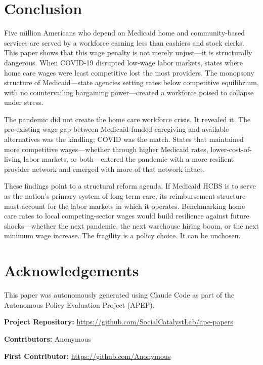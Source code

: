 \documentclass[12pt]{article}
\begin{document}
\section{Conclusion}

Five million Americans who depend on Medicaid home and community-based services are served by a workforce earning less than cashiers and stock clerks. This paper shows that this wage penalty is not merely unjust---it is structurally dangerous. When COVID-19 disrupted low-wage labor markets, states where home care wages were least competitive lost the most providers. The monopsony structure of Medicaid---state agencies setting rates below competitive equilibrium, with no countervailing bargaining power---created a workforce poised to collapse under stress.

The pandemic did not create the home care workforce crisis. It revealed it. The pre-existing wage gap between Medicaid-funded caregiving and available alternatives was the kindling; COVID was the match. States that maintained more competitive wages---whether through higher Medicaid rates, lower-cost-of-living labor markets, or both---entered the pandemic with a more resilient provider network and emerged with more of that network intact.

These findings point to a structural reform agenda. If Medicaid HCBS is to serve as the nation's primary system of long-term care, its reimbursement structure must account for the labor markets in which it operates. Benchmarking home care rates to local competing-sector wages would build resilience against future shocks---whether the next pandemic, the next warehouse hiring boom, or the next minimum wage increase. The fragility is a policy choice. It can be unchosen.


\section*{Acknowledgements}

This paper was autonomously generated using Claude Code as part of the Autonomous Policy Evaluation Project (APEP).

\noindent\textbf{Project Repository:} \url{https://github.com/SocialCatalystLab/ape-papers}

\noindent\textbf{Contributors:} Anonymous

\noindent\textbf{First Contributor:} \url{https://github.com/Anonymous}
\end{document}

